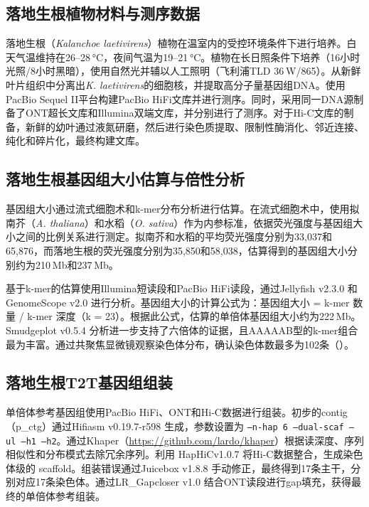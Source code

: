 \subsection{落地生根植物材料与测序数据}
落地生根（\textit{Kalanchoe laetivirens}）植物在温室内的受控环境条件下进行培养。白天气温维持在26–28 °C，夜间气温为19–21 °C。植物在长日照条件下培养（16小时光照/8小时黑暗），使用自然光并辅以人工照明（飞利浦TLD 36 W/865）。从新鲜叶片组织中分离出\textit{K. laetivirens}的细胞核，并提取高分子量基因组DNA。使用PacBio Sequel II平台构建PacBio HiFi文库并进行测序。同时，采用同一DNA源制备了ONT超长文库和Illumina双端文库，并分别进行了测序。对于Hi-C文库的制备，新鲜的幼叶通过液氮研磨，然后进行染色质提取、限制性酶消化、邻近连接、纯化和碎片化，最终构建文库。

\subsection{落地生根基因组大小估算与倍性分析}
基因组大小通过流式细胞术和k-mer分布分析进行估算。在流式细胞术中，使用拟南芥（\textit{A. thaliana}）和水稻（\textit{O. sativa}）作为内参标准，依据荧光强度与基因组大小之间的比例关系进行测定。拟南芥和水稻的平均荧光强度分别为33,037和65,876，而落地生根的荧光强度分别为35,850和58,038，估算得到的基因组大小分别约为210 Mb和237 Mb。

基于k-mer的估算使用Illumina短读段和PacBio HiFi读段，通过Jellyfish v2.3.0 和GenomeScope v2.0 进行分析\cite{marccais2011fast, ranallo2020genomescope}。基因组大小的计算公式为：基因组大小 = k-mer 数量 / k-mer 深度（k = 23）。根据此公式，估算的单倍体基因组大小约为222 Mb。Smudgeplot v0.5.4 分析进一步支持了六倍体的证据\cite{ranallo2020genomescope}，且AAAAAB型的k-mer组合最为丰富。通过共聚焦显微镜观察染色体分布，确认染色体数最多为102条（）。

\subsection{落地生根T2T基因组组装}
单倍体参考基因组使用PacBio HiFi、ONT和Hi-C数据进行组装。初步的contig（p\_ctg）通过Hifiasm v0.19.7-r598 生成\cite{cheng2026efficient}，参数设置为 \texttt{--n-hap 6 --dual-scaf --ul --h1 --h2}。通过Khaper（\url{https://github.com/lardo/khaper}）根据读深度、序列相似性和分布模式去除冗余序列。利用 HapHiCv1.0.7 将Hi-C数据整合\cite{zeng2024chromosome}，生成染色体级的 scaffold。组装错误通过Juicebox v1.8.8 手动修正\cite{durand2016juicebox}，最终得到17条主干，分别对应17条染色体。通过LR\_Gapcloser v1.0 结合ONT读段进行gap填充\cite{xu2019lr_gapcloser}，获得最终的单倍体参考组装。

